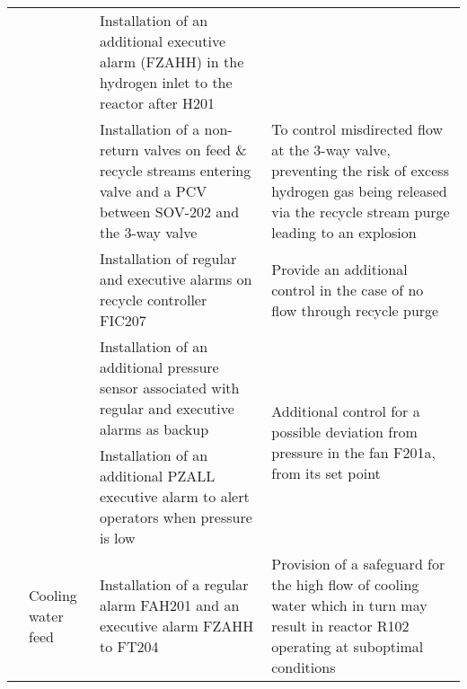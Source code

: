 \begin{table}[h]
\begin{tabular}{@{}llll@{}}
     &                                            & Installation of an additional executive alarm (FZAHH) in the hydrogen inlet to the reactor after H201                                                         &                                                                                                                                                                                                                                                         \\ \cmidrule(l){3-4} 
     &                                            & Installation of a non-return valves on feed \& recycle streams entering valve and a PCV between SOV-202 and the 3-way valve                                   & To control misdirected flow at the 3-way valve, preventing the risk of excess hydrogen gas being released via the recycle stream purge leading to an explosion                                          \\ \cmidrule(l){3-4} 
     &                                            & Installation of regular and executive alarms on  recycle controller FIC207                                                                                    & Provide an additional control in the case of no flow through recycle purge                                                                                                                                 \\ \cmidrule(l){3-4} 
     &                                            & Installation of an additional pressure sensor associated with regular and executive alarms as backup                                                          & \multirow{2}{*}{Additional control for a possible deviation from pressure in the fan F201a, from its set point}                                                                                            \\ \cmidrule(lr){3-3}
     &                                            & Installation of an additional PZALL executive alarm to alert operators when pressure is low                                                                   &                                                                                                                                                                                                                                                         \\ \cmidrule(l){2-4} 
     & \multirow{4}{*}{Cooling water feed}        & Installation of a regular alarm FAH201 and an executive alarm FZAHH to FT204                                                                                  & Provision of a safeguard for the high flow of cooling water which in turn may result in   reactor R102 operating at suboptimal conditions                                                                 \\ \cmidrule(l){3-4} 

\end{tabular}
\end{table}
